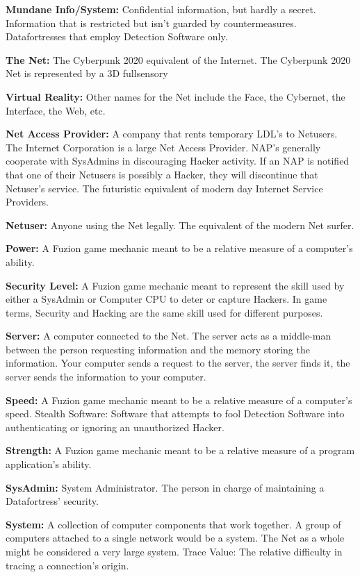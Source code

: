 \documentclass[11pt,twoside,a4paper]{article}
\newenvironment{local_itemize}{
\begin{itemize}
     \setlength{\itemsep}{1pt}
     \setlength{\parskip}{0pt}
     \setlength{\parsep}{0pt}}
{\end{itemize}
}
\begin{document}
\begin{multicols*}{2}
\begin{local_itemize}
		\vfill \columnbreak
	\item[] \textbf{Mundane Info/System: } Confidential information, but hardly a secret. Information that is restricted but isn't guarded by countermeasures. Datafortresses that employ Detection Software only.
	\item[] \textbf{The Net: } The Cyberpunk 2020 equivalent of the Internet. The Cyberpunk 2020 Net is represented by a 3D fullsensory
	\item[] \textbf{Virtual Reality: } Other names for the Net include the Face, the Cybernet, the Interface, the Web, etc.
	\item[] \textbf{Net Access Provider: } A company that rents temporary LDL's to Netusers. The Internet Corporation is a large Net Access Provider. NAP's generally cooperate with SysAdmins in discouraging Hacker activity. If an NAP is notified that one of their Netusers is possibly a Hacker, they will discontinue that Netuser's service. The futuristic equivalent of modern day Internet Service Providers.
	\item[] \textbf{Netuser: } Anyone using the Net legally. The equivalent of the modern Net surfer.
	\item[] \textbf{Power: } A Fuzion game mechanic meant to be a relative measure of a computer's ability.
	\item[] \textbf{Security Level: } A Fuzion game mechanic meant to represent the skill used by either a SysAdmin or Computer CPU to deter or capture Hackers. In game terms, Security and Hacking are the same skill used for different purposes.
	\item[] \textbf{Server: } A computer connected to the Net. The server acts as a middle-man between the person requesting information and the memory storing the information. Your computer sends a request to the server, the server finds it, the server sends the information to your computer.
	\item[] \textbf{Speed: } A Fuzion game mechanic meant to be a relative measure of a computer's speed. Stealth Software: Software that attempts to fool Detection Software into authenticating or ignoring an unauthorized Hacker.
	\item[] \textbf{Strength: } A Fuzion game mechanic meant to be a relative measure of a program application's ability.
	\item[] \textbf{SysAdmin: } System Administrator. The person in charge of maintaining a Datafortress' security.
	\item[] \textbf{System: } A collection of computer components that work together. A group of computers attached to a single network would be a system. The Net as a whole might be considered a very large system. Trace Value: The relative difficulty in tracing a connection's origin.

\end{local_itemize}
\end{multicols*}
\end{document}
